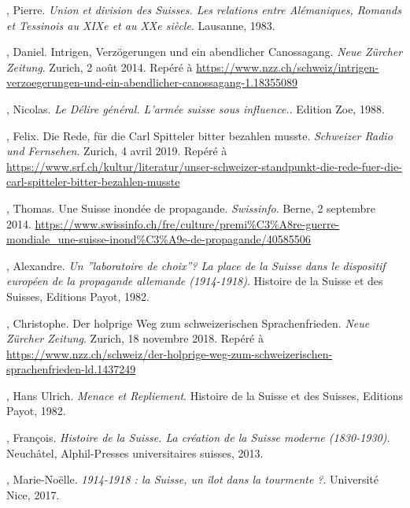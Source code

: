 \documentclass[french,a4paper]{article}
\begin{document}
\begin{thebibliography}{9}
, Pierre.
\textit{Union et division des Suisses. Les relations entre Alémaniques, Romands et Tessinois au XIXe et au XXe siècle}. Lausanne, 1983.

, Daniel.
Intrigen, Verzögerungen und ein abendlicher Canossagang. \textit{Neue Zürcher Zeitung}. Zurich, 2 août 2014.
Repéré à \url{https://www.nzz.ch/schweiz/intrigen-verzoegerungen-und-ein-abendlicher-canossagang-1.18355089}

, Nicolas.
\textit{Le Délire général. L'armée suisse sous influence.}. Edition Zoe, 1988.

, Felix.
Die Rede, für die Carl Spitteler bitter bezahlen musste. \textit{Schweizer Radio und Fernsehen}. Zurich, 4 avril 2019.
Repéré à \url{https://www.srf.ch/kultur/literatur/unser-schweizer-standpunkt-die-rede-fuer-die-carl-spitteler-bitter-bezahlen-musste}

, Thomas.
Une Suisse inondée de propagande.
\textit{Swissinfo}. Berne, 2 septembre 2014.
\url{https://www.swissinfo.ch/fre/culture/premi\%C3\%A8re-guerre-mondiale_une-suisse-inond\%C3\%A9e-de-propagande/40585506}

, Alexandre.
\textit{Un ”laboratoire de choix”? La place de la Suisse dans le dispositif européen de la propagande allemande (1914-1918)}.
Histoire de la Suisse et des Suisses, Editions Payot, 1982.

, Christophe.
Der holprige Weg zum schweizerischen Sprachenfrieden. \textit{Neue Zürcher Zeitung}. Zurich, 18 novembre 2018.
Repéré à \url{https://www.nzz.ch/schweiz/der-holprige-weg-zum-schweizerischen-sprachenfrieden-ld.1437249}

, Hans Ulrich.
\textit{Menace et Repliement}.
Histoire de la Suisse et des Suisses, Editions Payot, 1982.

, François.
\textit{Histoire de la Suisse. La création de la Suisse moderne (1830-1930)}. Neuchâtel, Alphil-Presses universitaires suisses, 2013.


, Marie-Noëlle.
\textit{1914-1918 : la Suisse, un îlot dans la tourmente ?}. Université Nice, 2017.

\end{thebibliography}
\end{document}
